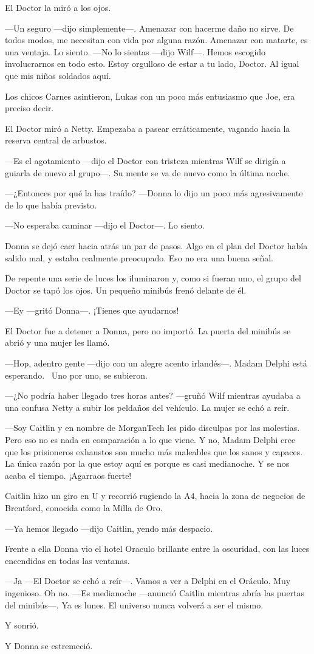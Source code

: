 El Doctor la miró a los ojos.

---Un seguro ---dijo simplemente---. Amenazar con hacerme daño no sirve.
De todos modos, me necesitan con vida por alguna razón. Amenazar con
matarte, es una ventaja. Lo siento. ---No lo sientas ---dijo Wilf---.
Hemos escogido involucrarnos en todo esto. Estoy orgulloso de estar a tu
lado, Doctor. Al igual que mis niños soldados aquí.

Los chicos Carnes asintieron, Lukas con un poco más entusiasmo que Joe,
era preciso decir.

El Doctor miró a Netty. Empezaba a pasear erráticamente, vagando hacia
la reserva central de arbustos.

---Es el agotamiento ---dijo el Doctor con tristeza mientras Wilf se
dirigía a guiarla de nuevo al grupo---. Su mente se va de nuevo como la
última noche.

---¿Entonces por qué la has traído? ---Donna lo dijo un poco más
agresivamente de lo que había previsto.

---No esperaba caminar ---dijo el Doctor---. Lo siento.

Donna se dejó caer hacia atrás un par de pasos. Algo en el plan del
Doctor había salido mal, y estaba realmente preocupado. Eso no era una
buena señal.

De repente una serie de luces los iluminaron y, como si fueran uno, el
grupo del Doctor se tapó los ojos. Un pequeño minibús frenó delante de
él.

---Ey ---gritó Donna---. ¡Tienes que ayudarnos!

El Doctor fue a detener a Donna, pero no importó. La puerta del minibús
se abrió y una mujer les llamó.

---Hop, adentro gente ---dijo con un alegre acento irlandés---. Madam
Delphi está esperando. ~Uno por uno, se subieron.

---¿No podría haber llegado tres horas antes? ---gruñó Wilf mientras
ayudaba a una confusa Netty a subir los peldaños del vehículo. La mujer
se echó a reír.

---Soy Caitlin y en nombre de MorganTech les pido disculpas por las
molestias. Pero eso no es nada en comparación a lo que viene. Y no,
Madam Delphi cree que los prisioneros exhaustos son mucho más maleables
que los sanos y capaces. La única razón por la que estoy aquí es porque
es casi medianoche. Y se nos acaba el tiempo. ¡Agarraos fuerte!

Caitlin hizo un giro en U y recorrió rugiendo la A4, hacia la zona de
negocios de Brentford, conocida como la Milla de Oro.

---Ya hemos llegado ---dijo Caitlin, yendo más despacio.

Frente a ella Donna vio el hotel Oraculo brillante entre la oscuridad,
con las luces encendidas en todas las ventanas.

---Ja ---El Doctor se echó a reír---. Vamos a ver a Delphi en el
Oráculo. Muy ingenioso. Oh no. ---Es medianoche ---anunció Caitlin
mientras abría las puertas del minibús---. Ya es lunes. El universo
nunca volverá a ser el mismo.

Y sonrió.

Y Donna se estremeció.
